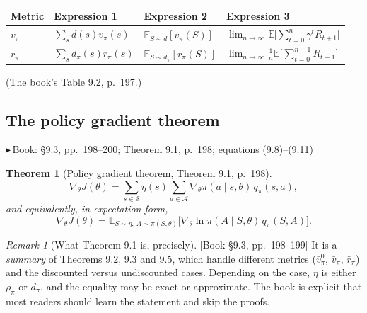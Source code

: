 \documentclass[11pt, letterpaper]{article}
\theoremstyle{runin}
\theoremstyle{runinplain}
\newtheorem{theorem}{Theorem}[section]
\theoremstyle{remark}
\newtheorem*{remark}{Remark}
\newcommand{\E}{\mathbb{E}}
\newcommand{\Sspace}{\mathcal{S}}
\newcommand{\Aspace}{\mathcal{A}}
\newcommand{\bk}[1]{{\color{bookblue}\small$\blacktriangleright$\,\textsf{Book: #1}}}
\newcommand{\bkin}[1]{{\color{bookblue}\small[\textsf{Book #1}]}}
\begin{document}
\begin{center}
\small
\begin{tabular}{@{}llll@{}}
\toprule
Metric & Expression 1 & Expression 2 & Expression 3 \\
\midrule
$\bar v_\pi$ & $\sum_s d(s)v_\pi(s)$ & $\E_{S\sim d}[v_\pi(S)]$
   & $\lim_{n\to\infty}\E\bigl[\sum_{t=0}^n\gamma^tR_{t+1}\bigr]$\\[0.3em]
$\bar r_\pi$ & $\sum_s d_\pi(s)r_\pi(s)$ & $\E_{S\sim d_\pi}[r_\pi(S)]$
   & $\lim_{n\to\infty}\frac1n\E\bigl[\sum_{t=0}^{n-1}R_{t+1}\bigr]$\\
\bottomrule
\end{tabular}
\end{center}
\centerline{\small (The book's Table 9.2, p.~197.)}

\subsection{The policy gradient theorem}

\bk{\S9.3, pp.~198--200; Theorem 9.1, p.~198; equations (9.8)--(9.11)}

\begin{theorem}[Policy gradient theorem, Theorem 9.1, p.~198]
\[
  \nabla_\theta J(\theta)=\sum_{s\in\Sspace}\eta(s)\sum_{a\in\Aspace}
    \nabla_\theta\pi(a\mid s,\theta)\,q_\pi(s,a),
  \tag{9.8}
\]
and equivalently, in expectation form,
\[
  \boxed{\;
  \nabla_\theta J(\theta)=\E_{S\sim\eta,\ A\sim\pi(S,\theta)}
    \bigl[\nabla_\theta\ln\pi(A\mid S,\theta)\,q_\pi(S,A)\bigr].
  \;}
  \tag{9.9}
\]
\end{theorem}

\begin{remark}[What Theorem 9.1 is, precisely]
\bkin{\S9.3, pp.~198--199} It is a \emph{summary} of Theorems 9.2, 9.3 and 9.5, which
handle different metrics ($\bar v_\pi^0$, $\bar v_\pi$, $\bar r_\pi$) and the
discounted versus undiscounted cases. Depending on the case, $\eta$ is either
$\rho_\pi$ or $d_\pi$, and the equality may be exact or approximate. The book is
explicit that most readers should learn the statement and skip the proofs.
\end{remark}
\end{document}
